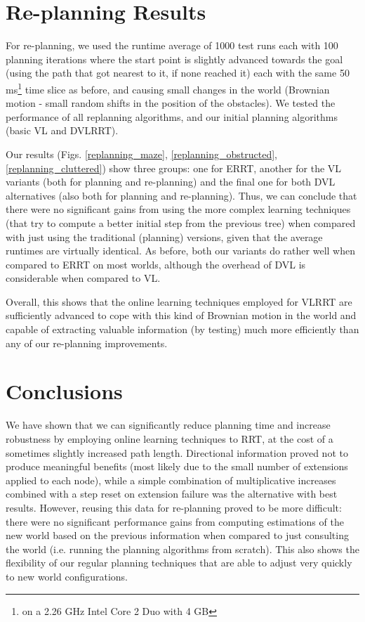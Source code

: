 \documentclass[10pt,twoside,twocolumn]{article}
\begin{document}
\section{Re-planning Results}

For re-planning, we used the runtime average of 1000 test runs each
with 100 planning iterations where the start point is slightly
advanced towards the goal (using the path that got nearest to it, if none reached it)
each with the same 50 ms\footnote{on a 2.26 GHz Intel Core 2 Duo with
  4 GB} time slice as before, and causing small changes in the world
(Brownian motion - small random shifts in the position of the
obstacles). We tested the performance of all replanning algorithms, 
and our initial planning algorithms (basic VL and DVLRRT).

Our results (Figs. \ref{replanning_maze}, \ref{replanning_obstructed}, \ref{replanning_cluttered}) 
show three groups: one for ERRT, another for the VL variants (both for
planning and re-planning) and the final one for both DVL
alternatives (also both for planning and re-planning). 
Thus, we can conclude that there were no significant gains 
from using the more complex learning techniques (that try to compute a
better initial step from the previous tree) 
when compared with just using the traditional (planning) versions,
given that the average runtimes are virtually identical. 
As before, both our variants do rather well when compared to ERRT 
on most worlds, although the overhead of DVL is considerable when compared to VL.

Overall, this shows that the online learning techniques employed for
VLRRT are sufficiently advanced to cope with this kind of Brownian
motion in the world 
and capable of extracting valuable information (by testing) much more efficiently 
than any of our re-planning improvements.

\section{Conclusions}

We have shown that we can significantly reduce planning time and
increase robustness by employing online learning techniques to RRT, 
at the cost of a sometimes slightly increased path length. Directional 
information proved not to produce meaningful benefits (most likely due
to the small number of extensions applied to each node), 
while a simple combination of multiplicative increases combined with 
a step reset on extension failure was the alternative with best results. 
However, reusing this data for re-planning proved to be more
difficult: there were no significant performance gains from computing 
estimations of the new world based on the previous information 
when compared to just consulting the world (i.e. running the planning
algorithms from scratch). This also shows the flexibility of our
regular planning techniques that are able to adjust very quickly to
new world configurations.
\end{document}
